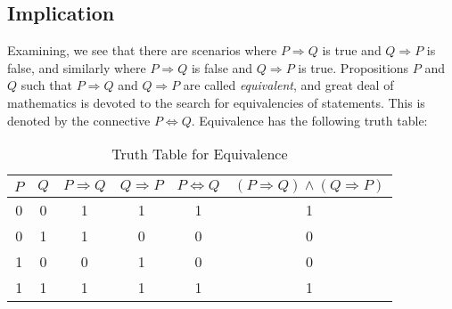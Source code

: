     \subsection{Implication}
        Examining, we see that there are scenarios where $P\Rightarrow{Q}$
        is true and $Q\Rightarrow{P}$ is false, and similarly where
        $P\Rightarrow{Q}$ is false and $Q\Rightarrow{P}$ is true. Propositions
        $P$ and $Q$ such that $P\Rightarrow{Q}$ and $Q\Rightarrow{P}$ are called
        \textit{equivalent}, and great deal of mathematics is devoted to the
        search for equivalencies of statements. This is denoted by the
        connective $P\Leftrightarrow{Q}$. Equivalence has the following truth
        table:
        \begin{table}[H]
            \centering
            \captionsetup{type=table}
            \begin{tabular}{cccccc}
                $P$&$Q$&$P\Rightarrow{Q}$&$Q\Rightarrow{P}$
                   &$P\Leftrightarrow{Q}$
                   &$(P\Rightarrow{Q})\land(Q\Rightarrow{P})$\\
                \hline
                0&0&1&1&1&1\\
                0&1&1&0&0&0\\
                1&0&0&1&0&0\\
                1&1&1&1&1&1
            \end{tabular}
            \caption{Truth Table for Equivalence}
            \label{tab:Truth_Table_for_Equivalence}
        \end{table}
